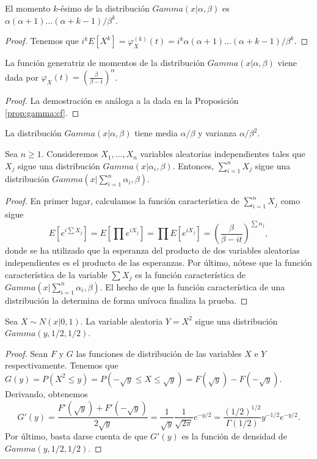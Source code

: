 \documentclass{article}
\begin{document}
\begin{cor}
    El momento $k$-ésimo de la distribución $Gamma(x|\alpha,\beta)$ es $\alpha (\alpha+1) \ldots (\alpha + k -1) / \beta^k$.
\end{cor}
\begin{proof}
    Tenemos que $i^k E[X^k]= \varphi_X^{(k)}(t) = i^k \alpha (\alpha+1) \ldots (\alpha + k -1) / \beta^k$.
\end{proof}

\begin{prop}
    La función generatriz de momentos de la distribución $Gamma(x|\alpha, \beta)$ viene dada por $\varphi_X(t) = \left(\frac{\beta}{\beta - t}\right)^\alpha$.
\end{prop}
\begin{proof}
    La demostración es análoga a la dada en la Proposición \ref{prop:gamma:cf}.
\end{proof}

\begin{cor}
    La distribución $Gamma(x|\alpha,\beta)$ tiene media $\alpha / \beta$ y varianza $\alpha / \beta^2$.
\end{cor}

\begin{prop}
    Sea $n \ge 1$. Consideremos $X_1, \ldots, X_n$ variables aleatorias independientes tales que $X_j$ sigue una distribución $Gamma(x|\alpha_i, \beta)$. Entonces, $\sum_{i=1}^n X_j$ sigue una distribución $Gamma(x|\sum_{i=1}^n \alpha_i, \beta)$.
\end{prop}
\begin{proof}
    En primer lugar, calculamos la función característica de $\sum_{i=1}^n X_j$ como sigue
    \[E[e^{i\sum X_j}] = E[\prod e^{iX_j}] = \prod E[e^{iX_j}] = \left(\frac{\beta}{\beta - it}\right)^{\sum \alpha_j},\]
    donde se ha utilizado que la esperanza del producto de dos variables aleatorias independientes es el producto de las esperanzas. Por último, nótese que la función característica de la variable $\sum X_j$ es la función característica de $Gamma(x|\sum_{i=1}^n \alpha_i, \beta)$. El hecho de que la función característica de una distribución la determina de forma unívoca finaliza la prueba.
\end{proof}

\begin{prop}
    Sea $X \sim N(x|0,1)$. La variable aleatoria $Y = X^2$ sigue una distribución $Gamma(y,1/2,1/2)$.
\end{prop}
\begin{proof}
    Sean $F$ y $G$ las funciones de distribución de las variables $X$ e $Y$ respectivamente. Tenemos que $G(y) = P(X^2 \le y) = P(- \sqrt{y} \le X \le \sqrt{y}) = F(\sqrt{y}) - F(-\sqrt{y})$. Derivando, obtenemos
    \[G'(y) = \frac{F'(\sqrt{y}) + F'(-\sqrt{y})}{2\sqrt{y}} = \frac{1}{\sqrt{y}} \frac{1}{\sqrt{2\pi}} e^{-y/2} = \frac{(1/2)^{1/2}}{\Gamma(1/2)} y^{-1/2} e^{-y/2}.\]
    Por último, basta darse cuenta de que $G'(y)$ es la función de densidad de $Gamma(y,1/2,1/2)$.
\end{proof}
\end{document}
